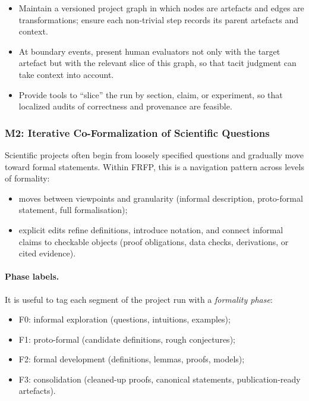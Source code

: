 \begin{itemize}
\item Maintain a versioned project graph in which nodes are artefacts and edges are transformations;
        ensure each non-trivial step records its parent artefacts and context.
  \item At boundary events, present human evaluators not only with the target
        artefact but with the relevant slice of this graph, so that tacit
        judgment can take context into account.
  \item Provide tools to ``slice'' the run by section, claim, or experiment,
        so that localized audits of correctness and provenance are feasible.
\end{itemize}

\subsubsection*{M2: Iterative Co-Formalization of Scientific Questions}

Scientific projects often begin from loosely specified questions and gradually
move toward formal statements.
Within FRFP, this is a navigation pattern across levels of formality:

\begin{itemize}
\item moves between viewpoints and granularity (informal description, proto-formal statement,
        full formalisation);
  \item explicit edits refine definitions, introduce notation, and connect informal claims to checkable
        objects (proof obligations, data checks, derivations, or cited evidence).
\end{itemize}

\paragraph{Phase labels.}
It is useful to tag each segment of the project run with a \emph{formality phase}:

\begin{itemize}
  \item F0: informal exploration (questions, intuitions, examples);
  \item F1: proto-formal (candidate definitions, rough conjectures);
  \item F2: formal development (definitions, lemmas, proofs, models);
  \item F3: consolidation (cleaned-up proofs, canonical statements,
        publication-ready artefacts).
\end{itemize}

